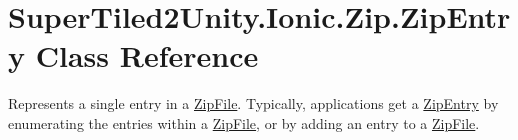 \hypertarget{class_super_tiled2_unity_1_1_ionic_1_1_zip_1_1_zip_entry}{}\section{Super\+Tiled2\+Unity.\+Ionic.\+Zip.\+Zip\+Entry Class Reference}
\label{class_super_tiled2_unity_1_1_ionic_1_1_zip_1_1_zip_entry}


Represents a single entry in a \mbox{\hyperlink{class_super_tiled2_unity_1_1_ionic_1_1_zip_1_1_zip_file}{Zip\+File}}. Typically, applications get a \mbox{\hyperlink{class_super_tiled2_unity_1_1_ionic_1_1_zip_1_1_zip_entry}{Zip\+Entry}} by enumerating the entries within a \mbox{\hyperlink{class_super_tiled2_unity_1_1_ionic_1_1_zip_1_1_zip_file}{Zip\+File}}, or by adding an entry to a \mbox{\hyperlink{class_super_tiled2_unity_1_1_ionic_1_1_zip_1_1_zip_file}{Zip\+File}}.  


